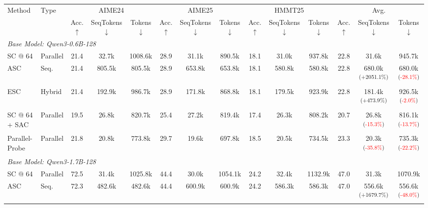\begin{table}[t]
\centering\small
\begin{adjustbox}{width=\textwidth}
\begin{tabular}{l l ccc ccc ccc ccc}
\toprule
Method & Type & \multicolumn{3}{c}{AIME24} & \multicolumn{3}{c}{AIME25} & \multicolumn{3}{c}{HMMT25} & \multicolumn{3}{c}{Avg.} \\
\cmidrule(lr){3-5}\cmidrule(lr){6-8}\cmidrule(lr){9-11}\cmidrule(lr){12-14}
& & Acc. $\uparrow$ & SeqTokens $\downarrow$ & Tokens $\downarrow$ & Acc. $\uparrow$ & SeqTokens $\downarrow$ & Tokens $\downarrow$ & Acc. $\uparrow$ & SeqTokens $\downarrow$ & Tokens $\downarrow$ & Acc. $\uparrow$ & SeqTokens $\downarrow$ & Tokens $\downarrow$ \\
\midrule
\multicolumn{14}{l}{\textit{Base Model: Qwen3-0.6B-128}} \\
\midrule
SC @ 64 & Parallel & 21.4 & 32.7k & 1008.6k & 28.9 & 31.1k & 890.5k & 18.1 & 31.0k & 937.8k & 22.8 & 31.6k  & 945.7k  \\
ASC & Seq. & 21.4 & 805.5k & 805.5k & 28.9 & 653.8k & 653.8k & 18.1 & 580.8k & 580.8k & 22.8 & 680.0k \textsuperscript{\scriptsize(\textcolor{green!80!black}{+2051.1\%})} & 680.0k \textsuperscript{\scriptsize(\textcolor{red}{-28.1\%})} \\
ESC & Hybrid & 21.4 & 192.9k & 986.7k & 28.9 & 171.8k & 868.8k & 18.1 & 179.5k & 923.9k & 22.8 & 181.4k \textsuperscript{\scriptsize(\textcolor{green!80!black}{+473.9\%})} & 926.5k \textsuperscript{\scriptsize(\textcolor{red}{-2.0\%})} \\
SC @ 64 + SAC & Parallel & 19.5 & 26.8k & 820.7k & 25.4 & 27.2k & 819.4k & 17.4 & 26.3k & 808.2k & 20.7 & 26.8k \textsuperscript{\scriptsize(\textcolor{red}{-15.3\%})} & 816.1k \textsuperscript{\scriptsize(\textcolor{red}{-13.7\%})} \\
Parallel-Probe & Parallel & 21.8 & 20.8k & 773.8k & 29.7 & 19.6k & 697.8k & 18.5 & 20.5k & 734.5k & 23.3 & 20.3k \textsuperscript{\scriptsize(\textcolor{red}{-35.8\%})} & 735.3k \textsuperscript{\scriptsize(\textcolor{red}{-22.2\%})} \\
\midrule
\multicolumn{14}{l}{\textit{Base Model: Qwen3-1.7B-128}} \\
\midrule
SC @ 64 & Parallel & 72.5 & 31.4k & 1025.8k & 44.4 & 30.0k & 1054.1k & 24.2 & 32.4k & 1132.9k & 47.0 & 31.3k  & 1070.9k  \\
ASC & Seq. & 72.3 & 482.6k & 482.6k & 44.4 & 600.9k & 600.9k & 24.2 & 586.3k & 586.3k & 47.0 & 556.6k \textsuperscript{\scriptsize(\textcolor{green!80!black}{+1679.7\%})} & 556.6k \textsuperscript{\scriptsize(\textcolor{red}{-48.0\%})} \\

\end{tabular}
\end{adjustbox}
\end{table}
